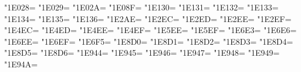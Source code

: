 \XeTeXcharclass"1E028=\KclassCM
\XeTeXcharclass"1E029=\KclassCM
\XeTeXcharclass"1E02A=\KclassCM
\XeTeXcharclass"1E08F=\KclassCM
\XeTeXcharclass"1E130=\KclassCM
\XeTeXcharclass"1E131=\KclassCM
\XeTeXcharclass"1E132=\KclassCM
\XeTeXcharclass"1E133=\KclassCM
\XeTeXcharclass"1E134=\KclassCM
\XeTeXcharclass"1E135=\KclassCM
\XeTeXcharclass"1E136=\KclassCM
\XeTeXcharclass"1E2AE=\KclassCM
\XeTeXcharclass"1E2EC=\KclassCM
\XeTeXcharclass"1E2ED=\KclassCM
\XeTeXcharclass"1E2EE=\KclassCM
\XeTeXcharclass"1E2EF=\KclassCM
\XeTeXcharclass"1E4EC=\KclassCM
\XeTeXcharclass"1E4ED=\KclassCM
\XeTeXcharclass"1E4EE=\KclassCM
\XeTeXcharclass"1E4EF=\KclassCM
\XeTeXcharclass"1E5EE=\KclassCM
\XeTeXcharclass"1E5EF=\KclassCM
\XeTeXcharclass"1E6E3=\KclassCM
\XeTeXcharclass"1E6E6=\KclassCM
\XeTeXcharclass"1E6EE=\KclassCM
\XeTeXcharclass"1E6EF=\KclassCM
\XeTeXcharclass"1E6F5=\KclassCM
\XeTeXcharclass"1E8D0=\KclassCM
\XeTeXcharclass"1E8D1=\KclassCM
\XeTeXcharclass"1E8D2=\KclassCM
\XeTeXcharclass"1E8D3=\KclassCM
\XeTeXcharclass"1E8D4=\KclassCM
\XeTeXcharclass"1E8D5=\KclassCM
\XeTeXcharclass"1E8D6=\KclassCM
\XeTeXcharclass"1E944=\KclassCM
\XeTeXcharclass"1E945=\KclassCM
\XeTeXcharclass"1E946=\KclassCM
\XeTeXcharclass"1E947=\KclassCM
\XeTeXcharclass"1E948=\KclassCM
\XeTeXcharclass"1E949=\KclassCM
\XeTeXcharclass"1E94A=\KclassCM

